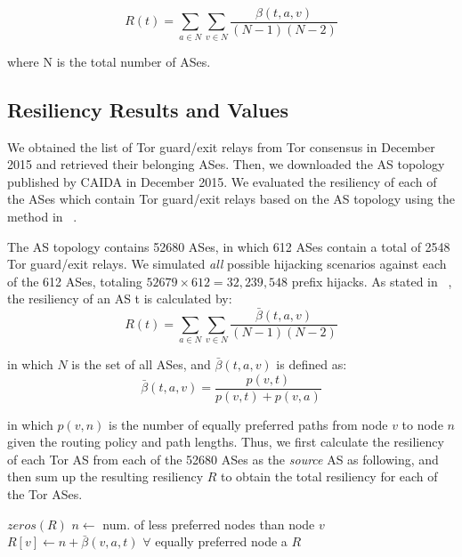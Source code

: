 \[R(t) = \sum_{a \in N} \sum_{v \in N} \frac{\beta(t,a,v)}{(N-1)(N-2)}\]

where N is the total number of ASes.



\subsection{Resiliency Results and Values}

We obtained the list of Tor guard/exit relays from Tor consensus in December 2015 and retrieved their belonging ASes. Then, we downloaded the AS topology published by CAIDA in December 2015. We evaluated the resiliency of each of the ASes which contain Tor guard/exit relays based on the AS topology using the method in ~\cite{lad2007understanding}. 

The AS topology contains 52680 ASes, in which 612 ASes contain a total of 2548 Tor guard/exit relays. We simulated \emph{all} possible hijacking scenarios against each of the 612 ASes, totaling $52679 \times 612 = 32,239,548$ prefix hijacks. As stated in ~\cite{lad2007understanding}, the resiliency of an AS t is calculated by:
\begin{equation}
R(t) = \sum_{a \in N} \sum_{v \in N} \frac {\bar{\beta}(t,a,v)} {(N-1)(N-2)}
\end{equation}

in which $N$ is the set of all ASes, and $\bar{\beta}(t,a,v)$ is defined as:
\begin{equation}
\bar{\beta}(t,a,v) = \frac {p(v,t)} {p(v,t) + p(v,a)}
\end{equation}

in which $p(v,n)$ is the number of equally preferred paths from node $v$ to node $n$ given the routing policy and path lengths. Thus, we first calculate the resiliency of each Tor AS from each of the 52680 ASes as the \emph{source} AS as following, and then sum up the resulting resiliency $R$ to obtain the total resiliency for each of the Tor ASes. 
\\
\begin{algorithmic}
    \State {}
    \State $zeros(R)$
		\State $n \gets $ num. of less preferred nodes than node $v$
		\State $R[v] \gets n + \bar{\beta}(v,a,t)$ $\forall$ equally preferred node a
	\EndIf
    \EndFor
    \State \Return $R$
\EndFunction
\end{algorithmic}

